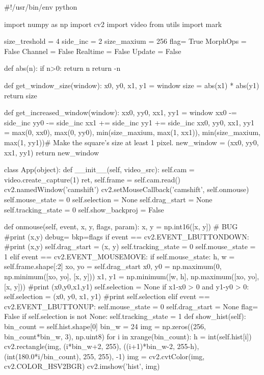 \documentclass{article}
\begin{document}
\begin{python}
#!/usr/bin/env python

import numpy as np
import cv2
import video
from utils import mark

size_treshold = 4
side_inc = 2
size_maxium = 256
flag= True
MorphOps = False
Channel = False
Realtime = False
Update = False

def abs(n):
    if n>0:
        return n
    return -n

def get_window_size(window):
    x0, y0, x1, y1 = window
    size = abs(x1) * abs(y1)
    return size

def get_increased_window(window):
    xx0, yy0, xx1, yy1 = window
    xx0 -= side_inc
    yy0 -= side_inc
    xx1 += side_inc
    yy1 += side_inc
    xx0, yy0, xx1, yy1 = max(0, xx0), max(0, yy0), min(size_maxium, max(1, xx1)), min(size_maxium, max(1, yy1))# Make the square's size at least 1 pixel.
    new_window = (xx0, yy0, xx1, yy1)
    return new_window

class App(object):
    def __init__(self, video_src):
        self.cam = video.create_capture(1)
        ret, self.frame = self.cam.read()
        cv2.namedWindow('camshift')
        cv2.setMouseCallback('camshift', self.onmouse)
        self.mouse_state = 0
        self.selection = None
        self.drag_start = None
        self.tracking_state = 0
        self.show_backproj = False

    def onmouse(self, event, x, y, flags, param):
        x, y = np.int16([x, y]) # BUG
        #print (x,y)
        debug={}
        bkp=flags
        if event == cv2.EVENT_LBUTTONDOWN:
            #print (x,y)
            self.drag_start = (x, y)
            self.tracking_state = 0
            self.mouse_state = 1
        elif event == cv2.EVENT_MOUSEMOVE:
            if self.mouse_state:
                h, w = self.frame.shape[:2]
                xo, yo = self.drag_start
                x0, y0 = np.maximum(0, np.minimum([xo, yo], [x, y]))
                x1, y1 = np.minimum([w, h], np.maximum([xo, yo], [x, y]))
                #print (x0,y0,x1,y1)
                self.selection = None
                if x1-x0 > 0 and y1-y0 > 0:
                    self.selection = (x0, y0, x1, y1)
                    #print self.selection
        elif event == cv2.EVENT_LBUTTONUP:
            self.mouse_state = 0
            self.drag_start = None
            flag= False
            if self.selection is not None:
                self.tracking_state = 1
    def show_hist(self):
        bin_count = self.hist.shape[0]
        bin_w = 24
        img = np.zeros((256, bin_count*bin_w, 3), np.uint8)
        for i in xrange(bin_count):
            h = int(self.hist[i])
            cv2.rectangle(img, (i*bin_w+2, 255), ((i+1)*bin_w-2, 255-h), (int(180.0*i/bin_count), 255, 255), -1)
        img = cv2.cvtColor(img, cv2.COLOR_HSV2BGR)
        cv2.imshow('hist', img)


\end{python}
\end{document}

